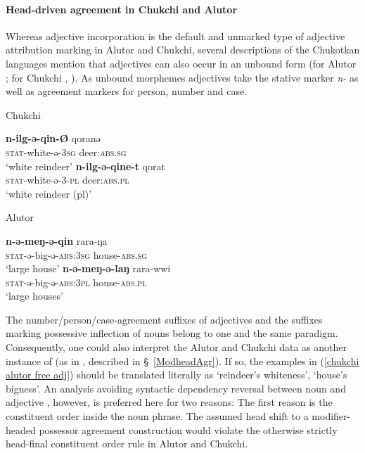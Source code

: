 \paragraph*{Head\hyp{}driven agreement in Chukchi and Alutor}
Whereas adjective incorporation is the default and unmarked type of adjective attribution marking in Alutor and Chukchi, several descriptions of the Chukotkan languages mention that adjectives can also occur in an unbound form (for Alutor \citealt{nagayama2003}; for Chukchi \citealt[103–104, 421–429]{skorik1960}, \citealt[251]{comrie1981}). As unbound morphemes adjectives take the stative marker \textit{n-} as well as agreement markers for person, number and case.
\begin{exe}
\ex \label{chukchi alutor free adj}
\begin{xlist}
\ex \rm{Chukchi \citep{skorik1960}}
\begin{xlist}
\ex
\gll	\textbf{n-ilg-ə-qin-Ø} qoranə\\
	\textsc{stat}-white-ə-\textsc{3sg} deer:\textsc{abs.sg}\\
\glt	‘white reindeer’
\ex
\gll	\textbf{n-ilg-ə-qine-t} qorat\\
	\textsc{stat}-white-ə-3-\textsc{pl} deer:\textsc{abs.pl}\\
\glt	‘white reindeer (pl)’
\end{xlist}
\ex \rm{Alutor \citep{nagayama2003}}
\begin{xlist}
\ex
\gll	\textbf{n-ə-meŋ-ə-qin} rara-ŋa\\
	\textsc{stat}-ə-big-ə-\textsc{abs:3sg} house-\textsc{abs.sg}\\
\glt	‘large house’
\ex
\gll	\textbf{n-ə-meŋ-ə-laŋ} rara-wwi\\
	\textsc{stat}-ə-big-ə-\textsc{abs:3pl} house-\textsc{abs.pl}\\
\glt	‘large houses’
\end{xlist}
\end{xlist}
\end{exe}
The number/person/case-agreement suffixes of adjectives and the suffixes marking possessive inflection of nouns belong to one and the same paradigm. Consequently, one could also interpret the Alutor and Chukchi data as another instance of  (as in , described in \S~\ref{ModheadAgr}). If so, the examples in (\ref{chukchi alutor free adj}) should be translated literally as ‘reindeer's whiteness’, ‘house's bigness’. An analysis avoiding syntactic dependency reversal between noun and adjective \citep[cf.][]{malchukov2000}, however, is preferred here for two reasons: The first reason is the constituent order inside the noun phrase. The assumed head shift to a modifier\hyp{}headed possessor agreement construction would violate the otherwise strictly head-final constituent order rule in Alutor and Chukchi. 

